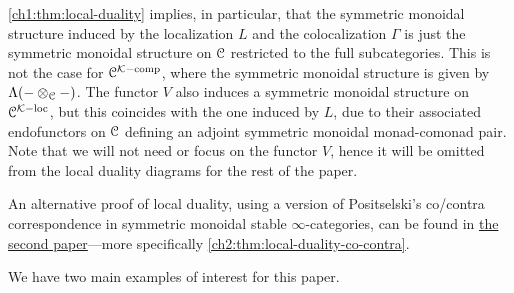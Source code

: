 \begin{remark}
    \label{ch1:rm:monoidal-structure-in-local-duality}
    \cref{ch1:thm:local-duality} implies, in particular, that the symmetric monoidal structure induced by the localization $L$ and the colocalization $\Gamma$ is just the symmetric monoidal structure on $\EuScript{C}$ restricted to the full subcategories. This is not the case for $\EuScript{C}^{\mathcal{K}-\mathrm{comp}}$, where the symmetric monoidal structure is given by $\Lambda(-\otimes_{\EuScript{C}}-)$. The functor $V$ also induces a symmetric monoidal structure on $\EuScript{C}^{\mathcal{K}-\mathrm{loc}}$, but this coincides with the one induced by $L$, due to their associated endofunctors on $\EuScript{C}$ defining an adjoint symmetric monoidal monad-comonad pair. Note that we will not need or focus on the functor $V$, hence it will be omitted from the local duality diagrams for the rest of the paper. 
\end{remark}

\begin{addendum}
    An alternative proof of local duality, using a version of Positselski's co/contra correspondence in symmetric monoidal stable $\infty$-categories, can be found in \hyperref[ch2]{the second paper}---more specifically \cref{ch2:thm:local-duality-co-contra}. 
\end{addendum}

We have two main examples of interest for this paper. 

